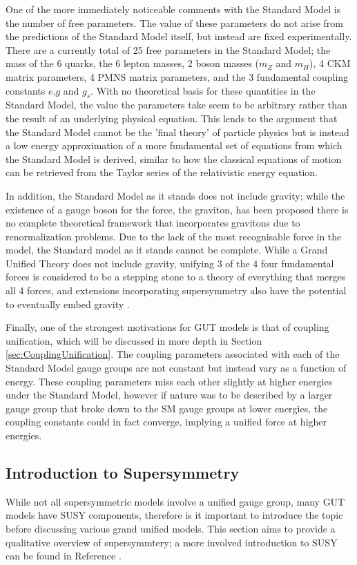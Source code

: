 \documentclass{article}
\begin{document}
One of the more immediately noticeable comments with the Standard Model is the number of free parameters. The value of these parameters do not arise from the predictions of the Standard Model itself, but instead are fixed experimentally. There are a currently total of 25 free parameters in the Standard Model; the mass of the 6 quarks, the 6 lepton masses, 2 boson masses ($m_Z$ and $m_H$), 4 CKM matrix parameters, 4 PMNS matrix parameters, and the 3 fundamental coupling constants $e$,$g$ and $g_s$. With no theoretical basis for these quantities in the Standard Model, the value the parameters take seem to be arbitrary rather than the result of an underlying physical equation. This lends to the argument that the Standard Model cannot be the 'final theory' of particle physics but is instead a low energy approximation of a more fundamental set of equations from which the Standard Model is derived, similar to how the classical equations of motion can be retrieved from the Taylor series of the relativistic energy equation.

In addition, the Standard Model as it stands does not include gravity; while the existence of a gauge boson for the force, the graviton, has been proposed there is no complete theoretical framework that incorporates gravitons due to renormalization problems. Due to the lack of the most recognisable force in the model, the Standard model as it stands cannot be complete. While a Grand Unified Theory does not include gravity, unifying 3 of the 4 four fundamental forces is considered to be a stepping stone to a theory of everything that merges all 4 forces, and extensions incorporating supersymmetry also have the potential to eventually embed gravity \cite{SUSYGravity}.

Finally, one of the strongest motivations for GUT models is that of coupling unification, which will be discussed in more depth in Section \ref{sec:CouplingUnification}. The coupling parameters associated with each of the Standard Model gauge groups are not constant but instead vary as a function of energy. These coupling parameters miss each other slightly at higher energies under the Standard Model, however if nature was to be described by a larger gauge group that broke down to the SM gauge groups at lower energies, the coupling constants could in fact converge, implying a unified force at higher energies. 

\subsection{Introduction to Supersymmetry}%
\label{sec:GUT_SUSYIntro}
While not all supersymmetric models involve a unified gauge group, many GUT models have SUSY components, therefore is it important to introduce the topic before discussing various grand unified models. This section aims to provide a qualitative overview of supersymmtery; a more involved introduction to SUSY can be found in Reference \cite{SUSYPrimer}.
\end{document}
